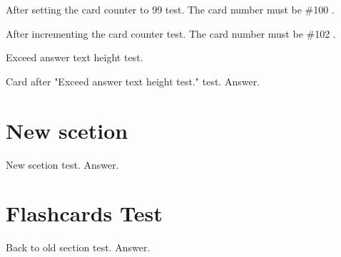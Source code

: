 \documentclass{../flashcards}
\begin{document}
\setcounter{card}{99}
\begin{card}{After setting the card counter to 99 test.}
The card number must be \#100 .
\end{card}

\begin{card}{After incrementing the card counter test.}
The card number must be \#102 .
\end{card}

\begin{card}{Exceed answer text height test.}
\footnotesize
\blindtext[4]
\end{card}

\begin{card}{Card after "Exceed answer text height test." test.}
Answer.
\end{card}

\section{New scetion}
\begin{card}{New scetion test.}
Answer.
\end{card}

\section{Flashcards Test}
\begin{card}{Back to old section test.}
Answer.
\end{card}

\listofcard

\printindex
\end{document}
